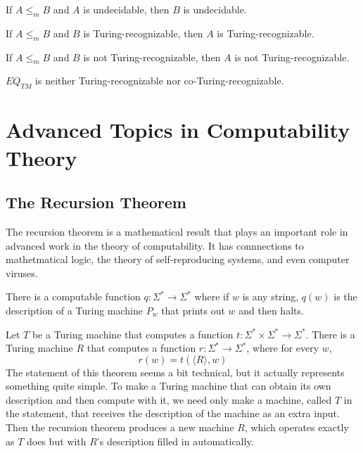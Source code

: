 \documentclass{article}
\begin{document}
\begin{theorem}
  If $A \leq_{m} B$ and $A$ is undecidable, then $B$ is undecidable.
\end{theorem}

\begin{theorem}
  If $A \leq_{m} B$ and $B$ is Turing-recognizable, then $A$ is Turing-recognizable. 
\end{theorem}

\begin{theorem}
  If $A \leq_{m} B$ and $B$ is not Turing-recognizable, then $A$ is not Turing-recognizable. 
\end{theorem}

\begin{theorem}
  $EQ_{TM}$ is neither Turing-recognizable nor co-Turing-recognizable. 
\end{theorem}

\section{Advanced Topics in Computability Theory}

\subsection{The Recursion Theorem}

The recursion theorem is a mathematical result that plays an important role in advanced work in the theory of computability. It has connnections to mathetmatical logic, the theory of self-reproducing systems, and even computer viruses. \\ 

 \begin{lemma}
   There is a computable function $q: \Sigma^{*} \rightarrow \Sigma^{*}$ where if $w$ is any string, $q(w)$ is the description of a Turing machine $P_w$ that prints out $w$ and then halts. 
 \end{lemma}

 \begin{theorem}
   Let $T$ be a Turing machine that computes a function $t:\Sigma^{*} \times \Sigma^{*} \rightarrow \Sigma^{*}$. There is a Turing machine $R$ that computes a function $r: \Sigma^{*} \rightarrow \Sigma^{*}$, where for every $w$, $$r(w) = t(\langle R \rangle, w)$$ The statement of this theorem seems a bit technical, but it actually represents something quite simple. To make a Turing machine that can obtain its own description and then compute with it, we need only make a machine, called $T$ in the statement, that receives the description of the machine as an extra input. Then the recursion theorem produces a new machine $R$, which operates exactly as $T$ does but with $R$'s description filled in automatically.
 \end{theorem}
\end{document}
